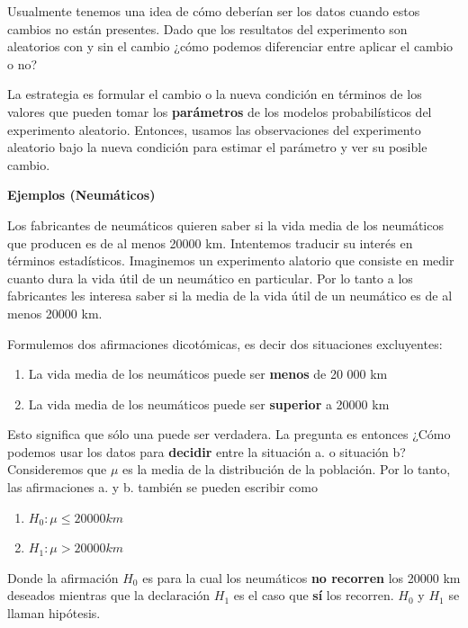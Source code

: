 \documentclass[
]{book}
\providecommand{\tightlist}{%
  \setlength{\itemsep}{0pt}\setlength{\parskip}{0pt}}
\begin{document}
Usualmente tenemos una idea de cómo deberían ser los datos cuando estos cambios no están presentes. Dado que los resultatos del experimento son aleatorios con y sin el cambio ¿cómo podemos diferenciar entre aplicar el cambio o no?

La estrategia es formular el cambio o la nueva condición en términos de los valores que pueden tomar los \textbf{parámetros} de los modelos probabilísticos del experimento aleatorio. Entonces, usamos las observaciones del experimento aleatorio bajo la nueva condición para estimar el parámetro y ver su posible cambio.

\textbf{Ejemplos (Neumáticos)}

Los fabricantes de neumáticos quieren saber si la vida media de los neumáticos que producen es de al menos 20000 km. Intentemos traducir su interés en términos estadísticos. Imaginemos un experimento alatorio que consiste en medir cuanto dura la vida útil de un neumático en particular. Por lo tanto a los fabricantes les interesa saber si la media de la vida útil de un neumático es de al menos 20000 km.

\newpage

Formulemos dos afirmaciones dicotómicas, es decir dos situaciones excluyentes:

\begin{enumerate}
\def\labelenumi{\alph{enumi}.}
\tightlist
\item
  La vida media de los neumáticos puede ser \textbf{menos} de 20 000 km
\item
  La vida media de los neumáticos puede ser \textbf{superior} a 20000 km
\end{enumerate}

Esto significa que sólo una puede ser verdadera. La pregunta es entonces ¿Cómo podemos usar los datos para \textbf{decidir} entre la situación a. o situación b? Consideremos que \(\mu\) es la media de la distribución de la población. Por lo tanto, las afirmaciones a. y b. también se pueden escribir como

\begin{enumerate}
\def\labelenumi{\alph{enumi}.}
\tightlist
\item
  \(H_0: \mu \leq 20000km\)
\item
  \(H_1: \mu > 20000km\)
\end{enumerate}

Donde la afirmación \(H_0\) es para la cual los neumáticos \textbf{no recorren} los 20000 km deseados mientras que la declaración \(H_1\) es el caso que \textbf{sí} los recorren. \(H_0\) y \(H_1\) se llaman hipótesis.
\end{document}
